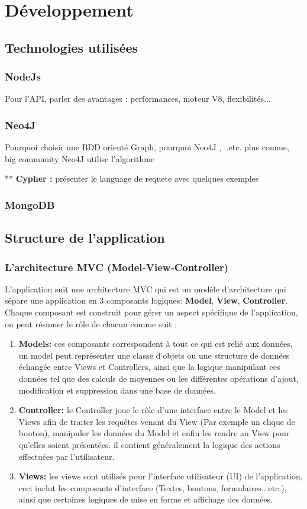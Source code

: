 \chapter{Développement}
\section{Technologies utilisées}
\subsection{NodeJs}
Pour l'API, parler des avantages : performances, moteur V8, flexibilités...  
\subsection{Neo4J}
Pourquoi choisir une BDD orienté Graph, pourquoi Neo4J , ..etc.
plus connue, big community
Neo4J utilise l'algorithme 

** \textbf{Cypher : } présenter le language de requete avec quelques exemples
\subsection{MongoDB}
		
\section{Structure de l'application}
	\subsection{L'architecture MVC (Model-View-Controller)}
	L'application suit une architecture MVC qui est un modèle d'architecture qui sépare une application en 3 composants logiques: \textbf{Model}, \textbf{View}, \textbf{Controller}.
	Chaque composant est construit pour gérer un aspect spécifique de l'application, on peut résumer le rôle de chacun comme suit :
	\begin{enumerate}
	\item \textbf{Models: } ces composants correspondent à tout ce qui est relié aux données, un model peut représenter une classe d'objets ou une structure de données échangée entre Views et Controllers, ainsi que la logique manipulant ces données tel que des calculs de moyennes ou les différentes opérations d'ajout, modification et suppression dans une base de données.
	\item \textbf{Controller: } le Controller joue le rôle d'une interface entre le Model et les Views afin de traiter les requêtes venant du View (Par exemple un clique de bouton), manipuler les données du Model et enfin les rendre au View pour qu'elles soient présentées. il contient généralement la logique des actions effectuées par l'utilisateur.
	\item \textbf{Views:} les views sont utilisés pour l'interface utilisateur (UI) de l'application, ceci inclut les composants d'interface (Textes, boutons, formulaires...etc.), ainsi que certaines logiques de mise en forme et affichage des données.
	\end{enumerate}
	
